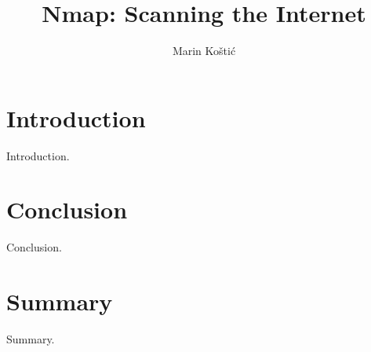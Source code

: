 \documentclass[times, utf8, seminar,english]{fer}
\begin{document}
\title{Nmap: Scanning the Internet}
\author{Marin Koštić}

\maketitle

\tableofcontents

\chapter{Introduction}
Introduction.

\chapter{Conclusion}
Conclusion.




\chapter{Summary}
Summary.
\end{document}
